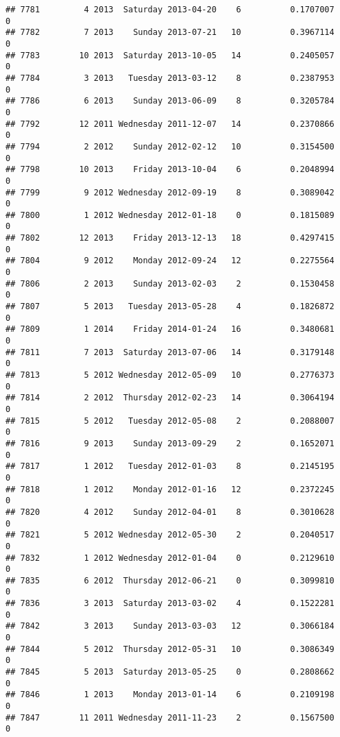 \documentclass[
]{article}
\begin{document}
\begin{verbatim}
## 7781         4 2013  Saturday 2013-04-20    6          0.1707007             0
## 7782         7 2013    Sunday 2013-07-21   10          0.3967114             0
## 7783        10 2013  Saturday 2013-10-05   14          0.2405057             0
## 7784         3 2013   Tuesday 2013-03-12    8          0.2387953             0
## 7786         6 2013    Sunday 2013-06-09    8          0.3205784             0
## 7792        12 2011 Wednesday 2011-12-07   14          0.2370866             0
## 7794         2 2012    Sunday 2012-02-12   10          0.3154500             0
## 7798        10 2013    Friday 2013-10-04    6          0.2048994             0
## 7799         9 2012 Wednesday 2012-09-19    8          0.3089042             0
## 7800         1 2012 Wednesday 2012-01-18    0          0.1815089             0
## 7802        12 2013    Friday 2013-12-13   18          0.4297415             0
## 7804         9 2012    Monday 2012-09-24   12          0.2275564             0
## 7806         2 2013    Sunday 2013-02-03    2          0.1530458             0
## 7807         5 2013   Tuesday 2013-05-28    4          0.1826872             0
## 7809         1 2014    Friday 2014-01-24   16          0.3480681             0
## 7811         7 2013  Saturday 2013-07-06   14          0.3179148             0
## 7813         5 2012 Wednesday 2012-05-09   10          0.2776373             0
## 7814         2 2012  Thursday 2012-02-23   14          0.3064194             0
## 7815         5 2012   Tuesday 2012-05-08    2          0.2088007             0
## 7816         9 2013    Sunday 2013-09-29    2          0.1652071             0
## 7817         1 2012   Tuesday 2012-01-03    8          0.2145195             0
## 7818         1 2012    Monday 2012-01-16   12          0.2372245             0
## 7820         4 2012    Sunday 2012-04-01    8          0.3010628             0
## 7821         5 2012 Wednesday 2012-05-30    2          0.2040517             0
## 7832         1 2012 Wednesday 2012-01-04    0          0.2129610             0
## 7835         6 2012  Thursday 2012-06-21    0          0.3099810             0
## 7836         3 2013  Saturday 2013-03-02    4          0.1522281             0
## 7842         3 2013    Sunday 2013-03-03   12          0.3066184             0
## 7844         5 2012  Thursday 2012-05-31   10          0.3086349             0
## 7845         5 2013  Saturday 2013-05-25    0          0.2808662             0
## 7846         1 2013    Monday 2013-01-14    6          0.2109198             0
## 7847        11 2011 Wednesday 2011-11-23    2          0.1567500             0

\end{verbatim}
\end{document}
